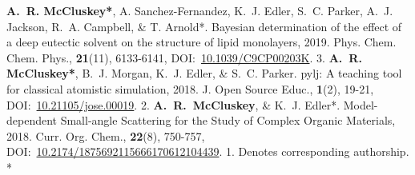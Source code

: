 \begin{cvpubys}
  \cvpuby
    {\textbf{A.~R. McCluskey*}, A. Sanchez-Fernandez, K.~J. Edler, S.~C. Parker, A.~J. Jackson, R.~A. Campbell, \& T. Arnold*.}
    {Bayesian determination of the effect of a deep eutectic solvent on the structure of lipid monolayers,}
    {2019.}
    {Phys. Chem. Chem. Phys.,}
    {\textbf{21}(11), 6133-6141,}
    {DOI:~\href{https://doi.org/10.1039/C9CP00203K}{10.1039/C9CP00203K}.}
    {3.}
  \cvpuby
    {\textbf{A.~R. McCluskey*}, B.~J. Morgan, K.~J. Edler, \& S.~C. Parker.}
    {pylj: A teaching tool for classical atomistic simulation,}
    {2018.}
    {J. Open Source Educ.,}
    {\textbf{1}(2), 19-21,}
    {DOI:~\href{http://doi.org/10.21105/jose.00019}{10.21105/jose.00019}.}
    {2.}
  \cvpuby
    {\textbf{A.~R.~McCluskey}, \& K.~J. Edler*.}
    {Model-dependent Small-angle Scattering for the Study of Complex Organic Materials,}
    {2018.}
    {Curr. Org. Chem.,}
    {\textbf{22}(8), 750-757,}
    {DOI:~\href{http://doi.org/10.2174/1875692115666170612104439}{10.2174/1875692115666170612104439}.}
    {1.}
  \cvpuby
    {Denotes corresponding authorship.}
    {}
    {}
    {}
    {}
    {}
    {*}
\end{cvpubys}
